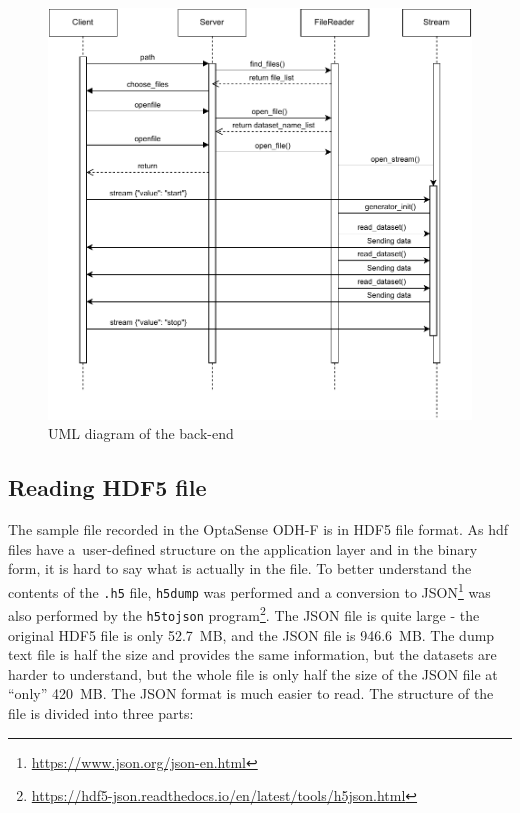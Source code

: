 \begin{figure}
    \centering
    \includegraphics{pdf/websocketcomm.drawio.pdf}
    \caption{UML diagram of the back-end}
    \label{fig:uml}
\end{figure}

\subsection{Reading HDF5 file}\label{txt.implementation.reading}

The sample file recorded in the OptaSense ODH-F is in HDF5 file format. As \ac{hdf} files have a~user-defined structure on the application layer and in the binary form, it is hard to say what is actually in the file. To better understand the contents of the \verb|.h5| file, \verb|h5dump| was performed and a conversion to JSON\footnote{\url{https://www.json.org/json-en.html}} was also performed by the \verb|h5tojson| program\footnote{\url{https://hdf5-json.readthedocs.io/en/latest/tools/h5json.html}}. The JSON file is quite large - the original HDF5 file is only \qty{52,7}{MB}, and the JSON file is \qty{946,6}{MB}. The dump text file is half the size and provides the same information, but the datasets are harder to understand, but the whole file is only half the size of the JSON file at ``only'' \qty{420}{MB}. The JSON format is much easier to read. The structure of the file is divided into three parts:

